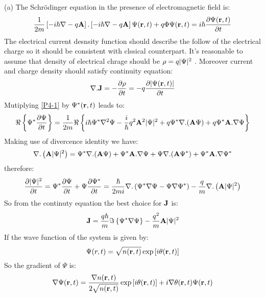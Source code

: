 \begin{homeworkProblem}
\begin{homeworkSection}{(a)}
The Schr\"odinger equation in the presence of electromagnetic field is:
\begin{equation}\label{P4-1}
\frac{1}{2m}\left[-i\hbar\nabla-q\mathbf{A}\right].\left[-i\hbar\nabla-q\mathbf{A}\right]\Psi(\mathbf{r},t)+q\Phi\Psi(\mathbf{r},t)=i\hbar\dfrac{\partial \Psi(\mathbf{r},t)}{\partial t}
\end{equation} 
The electrical current desnsity function should describe the follow of the electrical charge so it should be consistent with clssical counterpart. It's reasonable to assume that density of electrical chrage should be $\rho=q\lvert\Psi\rvert^2$ . Moreover current and charge density should satisfy continuity equation:
\begin{equation}
\nabla.\mathbf{J}=-\dfrac{\partial \rho}{\partial t}=-q\dfrac{\partial \lvert\Psi(\mathbf{r},t)\rvert}{\partial t}
\end{equation}
Mutiplying \eqref{P4-1} by $\Psi^*(\mathbf{r},t)$ leads to:
\begin{equation}
\Re\left\{\Psi^*\dfrac{\partial \Psi}{\partial t}\right\}=\frac{1}{2m}\Re\left\{i\hbar\Psi^*\nabla^2\Psi-\frac{i}{\hbar}q^2 \mathbf{A}^2\lvert\Psi\rvert^2+ q\Psi^*\nabla.(\mathbf{A}\Psi)+q\Psi^*\mathbf{A}.\nabla\Psi\right\}
\end{equation}
Making use of divercence identity we have:
\begin{equation}
\nabla.\left(\mathbf{A}\lvert\Psi\rvert^2\right)=\Psi^*\nabla.(\mathbf{A}\Psi)+\Psi^*\mathbf{A}.\nabla\Psi+\Psi\nabla.(\mathbf{A}\Psi^*)+\Psi^*\mathbf{A}.\nabla\Psi^*
\end{equation}
therefore:
\begin{equation}
\dfrac{\partial \lvert\Psi\rvert^2}{\partial t}=\Psi^*\dfrac{\partial \Psi}{\partial t}+\Psi\dfrac{\partial \Psi^*}{\partial t}=\frac{\hbar}{2mi}\nabla.\left(\Psi^*\nabla\Psi-\Psi\nabla\Psi^*\right)-\frac{q}{m}\nabla.\left(\mathbf{A}\lvert\Psi\rvert^2\right)
\end{equation}
So from the continuty equation the best choice for $\mathbf{J}$ is:
\begin{equation}\label{P4-20}
\mathbf{J}=\frac{q\hbar}{m}\Im\left\{\Psi^*\nabla\Psi\right\}-\frac{q^2}{m}\mathbf{A}\lvert\Psi\rvert^2
\end{equation}
If the wave function of the system  is given by:
\begin{equation}
\Psi(r,t)=\sqrt{n(\mathbf{r},t)}\exp\left[i\theta(\mathbf{r},t)\right]
\end{equation}
So the gradient of $\Psi$ is:
\begin{equation}\label{P4-110}
\nabla\Psi(\vp{r},t)=\frac{\nabla n(\vp{r},t)}{2\sqrt{n(\vp{r},t)}}\exp\left[i\theta(\vp{r},t)\right]+i\nabla\theta(\vp{r},t)\Psi(\vp{r},t)

\end{equation}
\end{homeworkSection}
\end{homeworkProblem}
